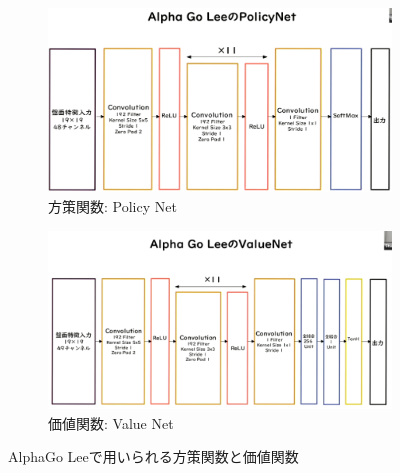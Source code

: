 \documentclass{ltjsarticle}
\begin{document}
\begin{figure}[htbp]
  \centering
  \begin{subfigure}[b]{0.45\textwidth}
    \centering
    \includegraphics[width=\textwidth]{./capture/AlphaGo_Lee_PolicyNet.png}
    \caption{方策関数: Policy Net}
    \label{fig:Swish}
  \end{subfigure}
  \hfill
  \begin{subfigure}[b]{0.45\textwidth}
    \centering
    \includegraphics[width=\textwidth]{./capture/AlphaGo_Lee_ValueNet.png}
    \caption{価値関数: Value Net}
    \label{fig:LeakyReLU}
  \end{subfigure}
  \caption{AlphaGo Leeで用いられる方策関数と価値関数}
\end{figure}
\end{document}
